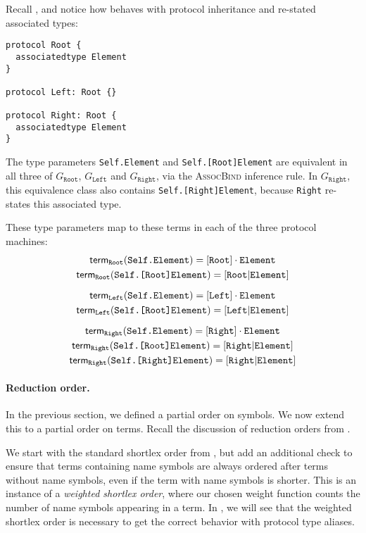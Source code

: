\documentclass[../generics]{subfiles}
\begin{document}
\begin{example}\label{rqm assoc bind example}
Recall , and notice how  behaves with protocol inheritance and re-stated associated types:
\begin{Verbatim}
protocol Root {
  associatedtype Element
}

protocol Left: Root {}

protocol Right: Root {
  associatedtype Element
}
\end{Verbatim}
The type parameters \texttt{Self.Element} and \texttt{Self.[Root]Element} are equivalent in all three of $G_\texttt{Root}$, $G_\texttt{Left}$ and $G_\texttt{Right}$, via the \textsc{AssocBind} inference rule. In $G_\texttt{Right}$, this equivalence class also contains \texttt{Self.[Right]Element}, because \texttt{Right} re-states this associated type.

These type parameters map to these terms in each of the three protocol machines:
\begin{gather*}
\mathsf{term}_{\texttt{Root}}(\texttt{Self.Element}) = [\texttt{Root}]\cdot\texttt{Element}\\
\mathsf{term}_{\texttt{Root}}(\texttt{Self.[Root]Element}) = [\texttt{Root}|\texttt{Element}]\\[\medskipamount]
\mathsf{term}_{\texttt{Left}}(\texttt{Self.Element}) = [\texttt{Left}]\cdot\texttt{Element}\\
\mathsf{term}_{\texttt{Left}}(\texttt{Self.[Root]Element}) = [\texttt{Left}|\texttt{Element}]\\[\medskipamount]
\mathsf{term}_{\texttt{Right}}(\texttt{Self.Element}) = [\texttt{Right}]\cdot\texttt{Element}\\
\mathsf{term}_{\texttt{Right}}(\texttt{Self.[Root]Element}) = [\texttt{Right}|\texttt{Element}]\\
\mathsf{term}_{\texttt{Right}}(\texttt{Self.[Right]Element}) = [\texttt{Right}|\texttt{Element}]
\end{gather*}
\end{example}

\paragraph{Reduction order.}
In the previous section, we defined a partial order on symbols. We now extend this to a partial order on terms. Recall the discussion of reduction orders from .

We start with the standard shortlex order from , but add an additional check to ensure that terms containing name symbols are always ordered after terms without name symbols, even if the term with name symbols is shorter. This is an instance of a \emph{weighted shortlex order}, where our chosen weight function counts the number of name symbols appearing in a term. In , we will see that the weighted shortlex order is necessary to get the correct behavior with protocol type aliases.
\end{document}
